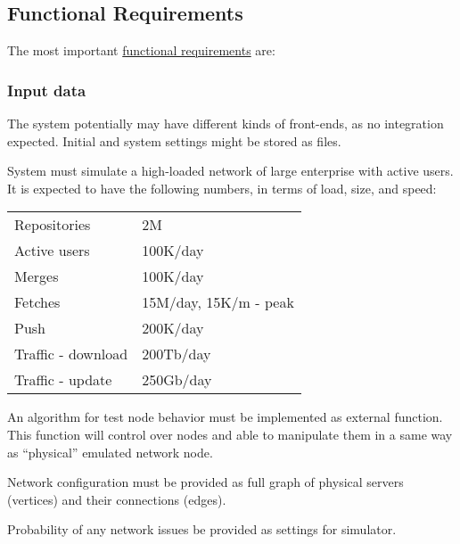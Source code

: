 \documentclass[12pt,oneside]{article}
\begin{document}
                      \subsection{Functional Requirements}
                      \label{sec:fr}

                      The most important \href{https://en.wikipedia.org/wiki/Functional_requirement}{functional requirements} are:

                      \subsubsection{Input data}
                      \label{sec:input}

                      The system potentially may have different kinds of front-ends, as no integration expected. Initial and system settings might be stored as files.

                      System must simulate a high-loaded network of large enterprise with active users. It is expected to have the following numbers, in terms of load, size, and speed:

                      \begin{tabular}{ll}
                        Repositories & 2M \\
                        Active users & 100K/day \\
                        Merges & 100K/day \\
                        Fetches & 15M/day, 15K/m - peak \\
                        Push & 200K/day \\
                        Traffic - download & 200Tb/day \\
                        Traffic - update & 250Gb/day \\
                      \end{tabular}

                      An algorithm for test node behavior must be implemented as external function. This function will control over nodes and able to manipulate them in a same way as ``physical'' emulated network node.

                      Network configuration must be provided as full graph of physical servers (vertices) and their connections (edges).

                      Probability of any network issues be provided as settings for simulator.
\end{document}
